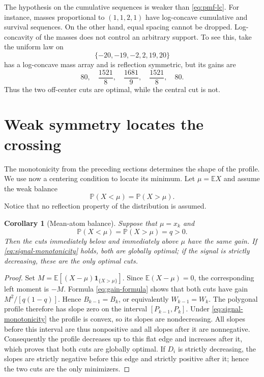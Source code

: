 \documentclass[a4paper]{amsart}
\numberwithin{equation}{section}
\newtheorem{corollary}[theorem]{Corollary}
\theoremstyle{remark}
\newcommand{\E}{\mathbb E}
\newcommand{\Pp}{\mathbb P}
\newcommand{\1}{\mathbf 1}
\begin{document}
The hypothesis on the cumulative sequences is weaker than
\eqref{eq:pmf-lc}.  For instance, masses proportional to $(1,1,2,1)$ have
log-concave cumulative and survival sequences.  On the other hand, equal
spacing cannot be dropped.  Log-concavity of the masses does not control an
arbitrary support.  To see this, take the uniform law on
\[
  \{-20,-19,-2,2,19,20\}
\]
has a log-concave mass array and is reflection symmetric, but its gains are
\[
  80,\quad \frac{1521}{8},\quad \frac{1681}{9},\quad
  \frac{1521}{8},\quad 80.
\]
Thus the two off-center cuts are optimal, while the central cut is not.


\section{Weak symmetry locates the crossing}
\label{sec:weak-symmetry}

The monotonicity from the preceding sections determines the shape of the
profile.  We use now a centering condition to locate its minimum.  Let
$\mu=\E X$ and assume the weak balance
\begin{equation}\label{eq:weak-balance}
  \Pp(X<\mu)=\Pp(X>\mu).
\end{equation}
Notice that no reflection property of the distribution is assumed.

\begin{corollary}[Mean-atom balance]\label{cor:mean-atom}
Suppose that $\mu=x_k$ and
\[
  \Pp(X<\mu)=\Pp(X>\mu)=q>0.
\]
Then the cuts immediately below and immediately above $\mu$ have the same
gain.  If \eqref{eq:signal-monotonicity} holds, both are globally optimal;
if the signal is strictly decreasing, these are the only optimal cuts.
\end{corollary}

\begin{proof}
Set $M=\E[(X-\mu)\1_{\{X>\mu\}}]$.  Since $\E(X-\mu)=0$, the corresponding
left moment is $-M$.  Formula \eqref{eq:gain-formula} shows that both cuts have
gain $M^2/[q(1-q)]$.  Hence $B_{k-1}=B_k$, or equivalently
$W_{k-1}=W_k$.  The polygonal profile therefore has slope zero on the interval
$[P_{k-1},P_k]$.  Under \eqref{eq:signal-monotonicity} the profile is convex,
so its slopes are nondecreasing.  All slopes before this interval are thus
nonpositive and all slopes after it are nonnegative.  Consequently the profile
decreases up to this flat edge and increases after it, which proves that both
cuts are globally optimal.  If $D_i$ is strictly decreasing, the slopes are
strictly negative before this edge and strictly positive after it; hence the
two cuts are the only minimizers.
\end{proof}
\end{document}
